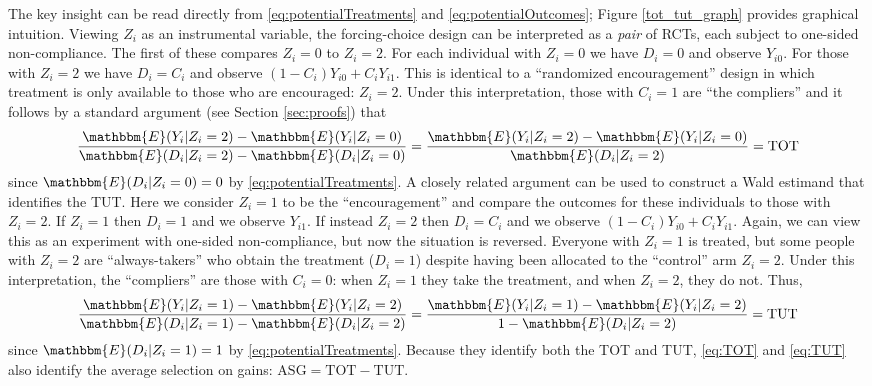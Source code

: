 \documentclass[12pt, a4paper]{article}
\begin{document}
The key insight can be read directly from \eqref{eq:potentialTreatments} and \eqref{eq:potentialOutcomes}; Figure \ref{tot_tut_graph} provides graphical intuition. %
Viewing $Z_i$ as an instrumental variable, the forcing-choice design can be interpreted as a \emph{pair} of RCTs, each subject to one-sided non-compliance.
The first of these compares $Z_i=0$ to $Z_i = 2$. For each individual with $Z_i = 0$ we have $D_i = 0$ and observe $Y_{i0}$. For those with $Z_i = 2$ we have $D_i = C_i$ and observe $(1 - C_i) Y_{i0} + C_i Y_{i1}$. This is identical to a ``randomized encouragement'' design in which treatment is only available to those who are encouraged: $Z_i = 2$. Under this interpretation, those with $C_i = 1$ are ``the compliers'' and it follows by a standard argument (see Section \ref{sec:proofs}) that 
\begin{equation}
\frac{\mathbbm{E}(Y_i|Z_i=2) - \mathbbm{E}(Y_i|Z_i =0)}{\mathbbm{E}(D_i|Z_i=2)-\mathbbm{E}(D_i|Z_i=0)} = 
\frac{\mathbbm{E}(Y_i|Z_i=2) - \mathbbm{E}(Y_i|Z_i =0)}{\mathbbm{E}(D_i|Z_i=2)} = \text{TOT} 
\label{eq:TOT}
\end{equation}
since $\mathbbm{E}(D_i|Z_i=0)=0$ by \eqref{eq:potentialTreatments}. 
A closely related argument can be used to construct a Wald estimand that identifies the TUT. Here we consider $Z_i = 1$ to be the ``encouragement'' and compare the outcomes for these individuals to those with $Z_i = 2$. If $Z_i = 1$ then $D_i = 1$ and we observe $Y_{i1}$.
If instead $Z_i = 2$ then $D_i = C_i$ and we observe $(1 - C_i) Y_{i0} + C_i Y_{i1}$. Again, we can view this as an experiment with one-sided non-compliance, but now the situation is reversed. Everyone with $Z_i = 1$ is treated, but some people with $Z_i = 2$ are ``always-takers'' who obtain the treatment ($D_i = 1$) despite having been allocated to the ``control'' arm $Z_i=2$. Under this interpretation, the ``compliers'' are those with $C_i = 0$: when $Z_i=1$ they take the treatment, and when $Z_i=2$, they do not. Thus, 
\begin{equation}
\frac{\mathbbm{E}(Y_i|Z_i=1) - \mathbbm{E}(Y_i|Z_i =2)}{\mathbbm{E}(D_i|Z_i=1)-\mathbbm{E}(D_i|Z_i=2)} = 
\frac{\mathbbm{E}(Y_i|Z_i=1) - \mathbbm{E}(Y_i|Z_i =2)}{1 - \mathbbm{E}(D_i|Z_i=2)} = \text{TUT}
\label{eq:TUT}
\end{equation}
since $\mathbbm{E}(D_i|Z_i = 1)= 1$ by \eqref{eq:potentialTreatments}. 
Because they identify both the TOT and TUT, \eqref{eq:TOT} and \eqref{eq:TUT} also identify the average selection on gains: $\text{ASG} = \text{TOT} - \text{TUT}$.
\end{document}
